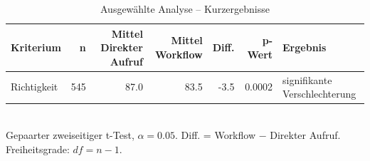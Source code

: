 \begin{table}[htbp]
\centering
\caption{Ausgewählte Analyse -- Kurzergebnisse}
\begin{tabular}{lrrrrrl}
\toprule
Kriterium & n & Mittel Direkter Aufruf & Mittel Workflow & Diff. & p-Wert & Ergebnis \\
\midrule
Richtigkeit & 545 & 87.0 & 83.5 & -3.5 & 0.0002 & signifikante Verschlechterung \\
\bottomrule
\end{tabular}
\\[2mm]
\footnotesize Gepaarter zweiseitiger t-Test, $\alpha=0.05$. Diff. = Workflow $-$ Direkter Aufruf. Freiheitsgrade: $df=n-1$.
\end{table}
